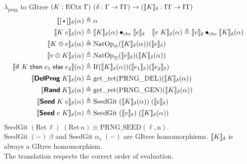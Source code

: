 \documentclass[8pt]{beamer}
\newcommand{\prng}{\mathrm{prng}}
\newcommand{\IT}{\mathrm{IT}}
\newcommand{\gRet}{\mathrm{Ret}}
\newcommand{\getret}{\mathrm{get\_ret}}
\newcommand{\cbvap}{\bullet_{\text{cbv}}}
\newcommand{\gnatop}[1]{\mathrm{NatOp}_{#1}}
\newcommand{\gif}{\mathrm{If}}
\begin{document}
\begin{frame}[allowframebreaks]{\(\lambda_\prng\) to GItree}
    \framebreak
    \((K : \iECtx\ \Gamma)\ (\senv : \Gamma \to \IT) \to (\sem{K}_\senv : \IT \to \IT)\)
    \begin{align*}
      \sem{\ctxhole}_\senv(\alpha) &\eqdef \alpha\\
      \sem{K\;e}_\senv(\alpha) &\eqdef \sem{K}_\senv(\alpha)\cbvap\sem{e}_\senv
      \quad \sem{v\;K}_\senv(\alpha) \eqdef \sem{v}_\senv\cbvap\sem{K}_\senv(\alpha)\\
      \sem{K \oplus e}_\senv(\alpha) &\eqdef \gnatop{\oplus}(\sem{K}_\senv(\alpha))(\sem{e}_\senv) \\
      \quad \sem{v \oplus K}_\senv(\alpha) &\eqdef \gnatop{\oplus}(\sem{e}_\senv)(\sem{K}_\senv(\alpha))\\
      \sem{\syn{if}\;K\;\syn{then}\;e_1\;\syn{else}\;e_2}(\alpha) & \eqdef \gif(\sem{K}_\senv(\alpha))(\sem{e_1}_\senv)(\sem{e_2}_\senv)\\
      \sem{\kw{DelPrng}\;K}_\senv(\alpha) &\eqdef \getret(\mathrm{PRNG\_DEL})(\sem{K}_\senv(\alpha)) \\
      \sem{\kw{Rand}\;K}_\senv(\alpha) &\eqdef \getret(\mathrm{PRNG\_GEN})(\sem{K}_\senv(\alpha)) \\
      \sem{\kw{Seed}\;K\;e}_\senv(\alpha) &\eqdef \mathrm{SeedGit}\;(\sem{K}_\senv(\alpha))\;(\sem{e}_\senv)\\
      \sem{\kw{Seed}\;v\;K}_\senv(\alpha) &\eqdef \mathrm{SeedGit}\;(\sem{v}_\senv)\;(\sem{K}_\senv(\alpha))\\
    \end{align*}
    \(\mathrm{SeedGit}\;(\gRet\,\ell)\;(\gRet\,n) \equiv \mathrm{PRNG\_SEED(\ell,n)}\).\\
    \(\mathrm{SeedGit}\;(-)\;\beta\) and \(\mathrm{SeedGit}\;\alpha_v\;(-)\) are GItree homomorphisms.
    \vfill
    \(\llbracket {K} \rrbracket_\delta\) is always a GItree homomorphism.\\
    The translation respects the correct order of evaluation.
  \end{frame}
\end{document}
